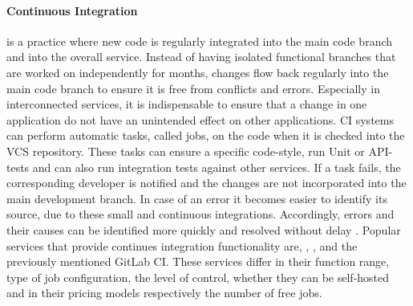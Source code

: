 \documentclass[12pt, a4paper]{article}
\begin{document}
        \paragraph{Continuous Integration} is a practice where new code is regularly integrated into the main code branch and into the overall service. Instead of having isolated functional branches that are worked on independently for months, changes flow back regularly into the main code branch to ensure it is free from conflicts and errors. Especially in interconnected services, it is indispensable to ensure that a change in one application do not have an unintended effect on other applications. \ac{CI} systems can perform automatic tasks, called jobs, on the code when it is checked into the \ac{VCS} repository. These tasks can ensure a specific code-style, run Unit or \acs{API}-tests and can also run integration tests against other services. If a task fails, the corresponding developer is notified and the changes are not incorporated into the main development branch. In case of an error it becomes easier to identify its source, due to these small and continuous integrations. Accordingly, errors and their causes can be identified more quickly and resolved without delay \cite{azuredevops}.\newline
        Popular services that provide continues integration functionality are, , ,  and the previously mentioned GitLab \ac{CI}. These services differ in their function range, type of job configuration, the level of control, whether they can be self-hosted and in their pricing models respectively the number of free jobs.
\end{document}
